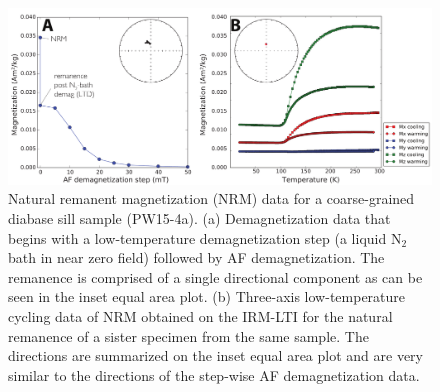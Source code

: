 \documentclass[draft,gc]{AGUTeX}
\begin{document}
\begin{figure}
\noindent\includegraphics[width=\textwidth]{Umkondo_PW15_NRM.pdf}
\caption{Natural remanent magnetization (NRM) data for a coarse-grained diabase sill sample (PW15-4a). (a) Demagnetization data that begins with a low-temperature demagnetization step (a liquid N$_2$ bath in near zero field) followed by AF demagnetization. The remanence is comprised of a single directional component as can be seen in the inset equal area plot. (b) Three-axis low-temperature cycling data of NRM obtained on the IRM-LTI for the natural remanence of a sister specimen from the same sample. The directions are summarized on the inset equal area plot and are very similar to the directions of the step-wise AF demagnetization data.}
\label{fig:Umkondo_PW15NRM}
\end{figure}
\end{document}
